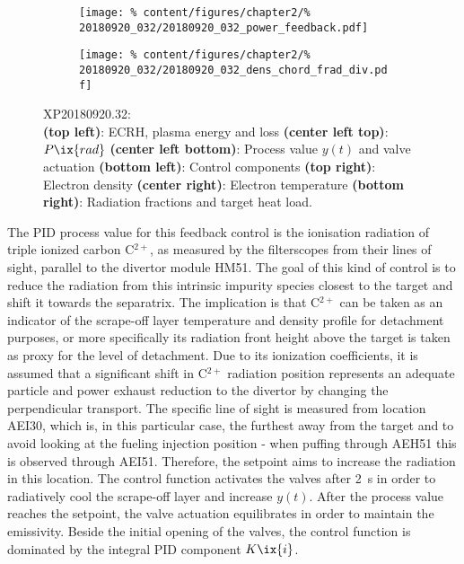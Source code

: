                 \begin{figure}[t]%
                    \centering%
                    \begin{subfigure}{.48\textwidth}%
                        \centering%
                        \texttt{[image: \%
                            content/figures/chapter2/\%
                            20180920\_032/20180920\_032\_power\_feedback.pdf]}%
                    \end{subfigure}%
                    \hfill%
                    \begin{subfigure}{.48\textwidth}%
                        \centering%
                        \texttt{[image: \%
                            content/figures/chapter2/\%
                            20180920\_032/20180920\_032\_dens\_chord\_frad\_div.pdf]}%
                    \end{subfigure}%
                    \caption{%
                        XP20180920.32:\\%
                        \textbf{(top left)}: ECRH, plasma energy and loss \textbf{(center left top)}: $P\ix{rad}$ \textbf{(center left bottom)}: Process value $y\left(t\right)$ and valve actuation \textbf{(bottom left)}: Control components \textbf{(top right)}: Electron density \textbf{(center right)}: Electron temperature \textbf{(bottom right)}: Radiation fractions and target heat load.}\label{fig:20180920.32_PDF}%
                \end{figure}%
%
                The PID process value for this feedback control is the ionisation radiation of triple ionized carbon C$^{2+}$, as measured by the filterscopes from their lines of sight, parallel to the divertor module HM51. The goal of this kind of control is to reduce the radiation from this intrinsic impurity species closest to the target and shift it towards the separatrix. The implication is that C$^{2+}$ can be taken as an indicator of the scrape-off layer temperature and density profile for detachment purposes, or more specifically its radiation front height above the target is taken as proxy for the level of detachment. Due to its ionization coefficients, it is assumed that a significant shift in C$^{2+}$ radiation position represents an adequate particle and power exhaust reduction to the divertor by changing the perpendicular transport. The specific line of sight is measured from location AEI30, which is, in this particular case, the furthest away from the target and to avoid looking at the fueling injection position - when puffing through AEH51 this is observed through AEI51. Therefore, the setpoint aims to increase the radiation in this location. The control function activates the valves after \SI{2}{\second} in order to radiatively cool the scrape-off layer and increase $y\left(t\right)$. After the process value reaches the setpoint, the valve actuation equilibrates in order to maintain the emissivity. Beside the initial opening of the valves, the control function is dominated by the integral PID component $K\ix{i}$.\\%
